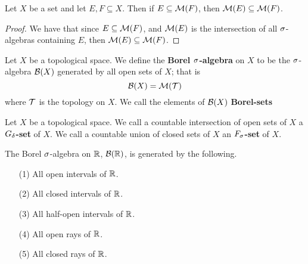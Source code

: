 \begin{lemma}\label{8.1.4}
    Let $X$ be a set and let $E,F \subseteq X$. Then if $E \subseteq \mathcal{M}(F)$,
    then $\mathcal{M}(E) \subseteq \mathcal{M}(F)$.
\end{lemma}
\begin{proof}
    We have that since $E \subseteq \mathcal{M}(F)$, and $\mathcal{M}(E)$ is the intersection of
    all $\sigma$-algebras containing  $E$, then  $\mathcal{M}(E) \subseteq \mathcal{M}(F)$.
\end{proof}

\begin{definition}
    Let $X$ be a topological space. We define the  \textbf{Borel $\sigma$-algebra}
    on $X$ to be the  $\sigma$-algebra  $\mathcal{B}(X)$ generated by all open sets of $X$;
    that is
    \begin{equation*}
        \mathcal{B}(X)=\mathcal{M}(\mathcal{T})
    \end{equation*}
    where $\mathcal{T}$ is the topology on $X$. We call the elements of $\mathcal{B}(X)$
    \textbf{Borel-sets}
\end{definition}

\begin{definition}
    Let $X$ be a topological space. We call a countable intersection of open
    sets of  $X$ a \textbf{$G_\delta$-set} of $X$. We call a countable union of
    closed sets of $X$ an  \textbf{$F_\sigma$-set} of $X$.
\end{definition}

\begin{theorem}\label{8.1.5}
    The Borel $\sigma$-algebra on $\mathbb{R}$,  $\mathcal{B}(\mathbb{R})$, is generated by the following.
    \begin{enumerate}
        \item[(1)] All open intervals of $\mathbb{R}$.

        \item[(2)] All closed intervals of $\mathbb{R}$.

        \item[(3)] All half-open intervals of $\mathbb{R}$.

        \item[(4)] All open rays of $\mathbb{R}$.

        \item[(5)] All closed rays of $\mathbb{R}$.
    \end{enumerate}
\end{theorem}
